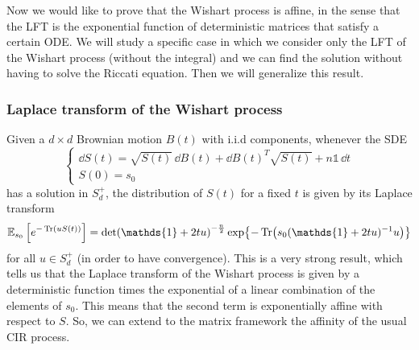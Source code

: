  Now we would like to prove that the Wishart process is affine, in the sense that the LFT is the exponential function of deterministic matrices that satisfy a certain ODE. We will study a specific case in which we consider only the LFT of the Wishart process (without the integral) and we can find the solution without having to solve the Riccati equation. Then we will generalize this result.\\

\subsubsection{Laplace transform of the Wishart process}
Given a $d\times d$ Brownian motion $B(t)$ with i.i.d components, whenever the SDE
\begin{equation}
    \begin{cases}
    \dd S(t) = \sqrt{S(t)}\,\dd B(t) + \dd B(t)^T\sqrt{S(t)} + n\mathds{1}\,\dd t \\
    S(0) = s_0
    \end{cases}
\end{equation}
has a solution in $S_d^+$, the distribution of $S(t)$ for a fixed $t$ is given by its Laplace transform
\begin{equation}\label{lapltrWis}
    \mathbb{E}_{s_0}\left[e^{-\Tr(uS(t))}\right] = \det(\mathds{1}+2tu)^{-\frac{n}{2}}\exp{-\Tr(s_0(\mathds{1}+2tu)^{-1}u)}
\end{equation}
for all $u\in S_d^+$ (in order to have convergence). This is a very strong result, which tells us that the Laplace transform of the Wishart process is given by a deterministic function times the exponential of a linear combination of the elements of $s_0$. This means that the second term is exponentially affine with respect to $S$. So, we can extend to the matrix framework the affinity of the usual CIR process.
